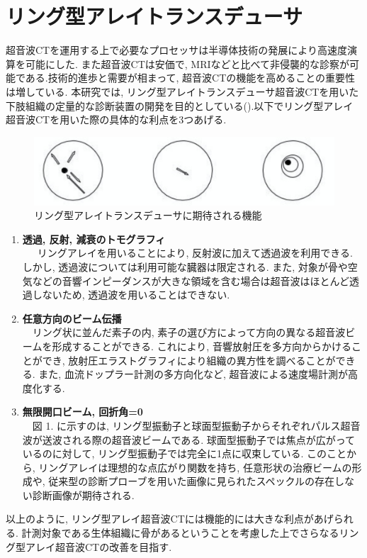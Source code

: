 \section{リング型アレイトランスデューサ} 
超音波CTを運用する上で必要なプロセッサは半導体技術の発展により高速度演算を可能にした. また超音波CTは安価で, MRIなどと比べて非侵襲的な診察が可能である.技術的進歩と需要が相まって, 超音波CTの機能を高めることの重要性は増している.  本研究では, リング型アレイトランスデューサ超音波CTを用いた下肢組織の定量的な診断装置の開発を目的としている().以下でリング型アレイ超音波CTを用いた際の具体的な利点を3つあげる\cite{senpai}.
\begin{figure}[h]
  \begin{center}
    \includegraphics[width=120mm]{fig/three.pdf}
  \end{center}
  \caption{リング型アレイトランスデューサに期待される機能}
\end{figure}
\begin{enumerate}
\item{\bf 透過, 反射, 減衰のトモグラフィ}
\\\ \ \ リングアレイを用いることにより, 反射波に加えて透過波を利用できる. しかし, 透過波については利用可能な臓器は限定される. また, 対象が骨や空気などの音響インピーダンスが大きな領域を含む場合は超音波はほとんど透過しないため, 透過波を用いることはできない. 
\item{\bf 任意方向のビーム伝播}
\\\ \ リング状に並んだ素子の内, 素子の選び方によって方向の異なる超音波ビームを形成することができる. これにより, 音響放射圧を多方向からかけることができ, 放射圧エラストグラフィにより組織の異方性を調べることができる. また, 血流ドップラー計測の多方向化など, 超音波による速度場計測が高度化する. 
\item{\bf 無限開口ビーム, 回折角=0}
\\\ \ 図 1. に示すのは, リング型振動子と球面型振動子からそれぞれパルス超音波が送波される際の超音波ビームである. 球面型振動子では焦点が広がっているのに対して, リング型振動子では完全に1点に収束している. このことから, リングアレイは理想的な点広がり関数を持ち, 任意形状の治療ビームの形成や, 従来型の診断プローブを用いた画像に見られたスペックルの存在しない診断画像が期待される. 
\end{enumerate} 
以上のように, リング型アレイ超音波CTには機能的には大きな利点があげられる.  計測対象である生体組織に骨があるということを考慮した上でさらなるリング型アレイ超音波CTの改善を目指す. 

